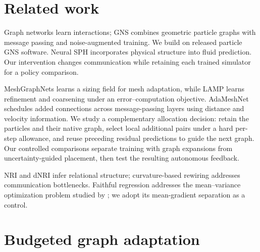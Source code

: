 
\section{Related work}
Graph networks learn interactions\citep{battaglia2016}; GNS combines geometric particle graphs with message passing and noise-augmented training\citep{sanchez2020}. We build on released particle GNS software\citep{kumar2023}. Neural SPH incorporates physical structure into fluid prediction\citep{toshev2024}. Our intervention changes communication while retaining each trained simulator for a policy comparison.

MeshGraphNets learns a sizing field for mesh adaptation\citep{pfaff2021}, while LAMP learns refinement and coarsening under an error--computation objective\citep{wu2023}. AdaMeshNet schedules added connections across message-passing layers using distance and velocity information\citep{seo2025}. We study a complementary allocation decision: retain the particles and their native graph, select local additional pairs under a hard per-step allowance, and reuse preceding residual predictions to guide the next graph. Our controlled comparisons separate training with graph expansions from uncertainty-guided placement, then test the resulting autonomous feedback.

NRI and dNRI infer relational structure\citep{kipf2018,graber2020}; curvature-based rewiring addresses communication bottlenecks\citep{topping2022}. Faithful regression\citep{stirn2023} addresses the mean--variance optimization problem studied by \citet{seitzer2022}; we adopt its mean-gradient separation as a control.

\section{Budgeted graph adaptation}
